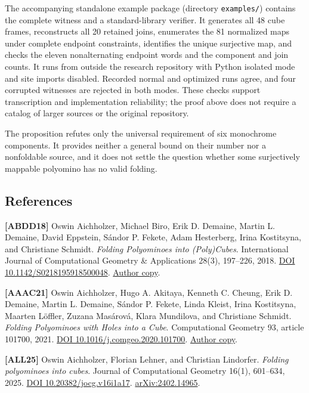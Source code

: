 \documentclass[
  11pt,
]{article}
\begin{document}
The accompanying standalone example package (directory
\texttt{examples/}) contains the complete witness and a standard-library
verifier. It generates all 48 cube frames, reconstructs all 20 retained
joins, enumerates the 81 normalized maps under complete endpoint
constraints, identifies the unique surjective map, and checks the eleven
nonalternating endpoint words and the component and join counts. It runs
from outside the research repository with Python isolated mode and site
imports disabled. Recorded normal and optimized runs agree, and four
corrupted witnesses are rejected in both modes. These checks support
transcription and implementation reliability; the proof above does not
require a catalog of larger sources or the original repository.

The proposition refutes only the universal requirement of six monochrome
components. It provides neither a general bound on their number nor a
nonfoldable source, and it does not settle the question whether some
surjectively mappable polyomino has no valid folding.

\subsection{References}\label{references}

\textbf{{[}ABDD18{]}} Oswin Aichholzer, Michael Biro, Erik D. Demaine,
Martin L. Demaine, David Eppstein, Sándor P. Fekete, Adam Hesterberg,
Irina Kostitsyna, and Christiane Schmidt. \emph{Folding Polyominoes into
(Poly)Cubes}. International Journal of Computational Geometry \&
Applications 28(3), 197--226, 2018.
\href{https://doi.org/10.1142/S0218195918500048}{DOI
10.1142/S0218195918500048}.
\href{https://erikdemaine.org/papers/PolyformFolding_IJCGA/}{Author
copy}.

\textbf{{[}AAAC21{]}} Oswin Aichholzer, Hugo A. Akitaya, Kenneth C.
Cheung, Erik D. Demaine, Martin L. Demaine, Sándor P. Fekete, Linda
Kleist, Irina Kostitsyna, Maarten Löffler, Zuzana Masárová, Klara
Mundilova, and Christiane Schmidt. \emph{Folding Polyominoes with Holes
into a Cube}. Computational Geometry 93, article 101700, 2021.
\href{https://doi.org/10.1016/j.comgeo.2020.101700}{DOI
10.1016/j.comgeo.2020.101700}.
\href{https://erikdemaine.org/papers/CubeFoldingHoles_CGTA/}{Author
copy}.

\textbf{{[}ALL25{]}} Oswin Aichholzer, Florian Lehner, and Christian
Lindorfer. \emph{Folding polyominoes into cubes}. Journal of
Computational Geometry 16(1), 601--634, 2025.
\href{https://doi.org/10.20382/jocg.v16i1a17}{DOI
10.20382/jocg.v16i1a17}.
\href{https://arxiv.org/abs/2402.14965}{arXiv:2402.14965}.
\end{document}
